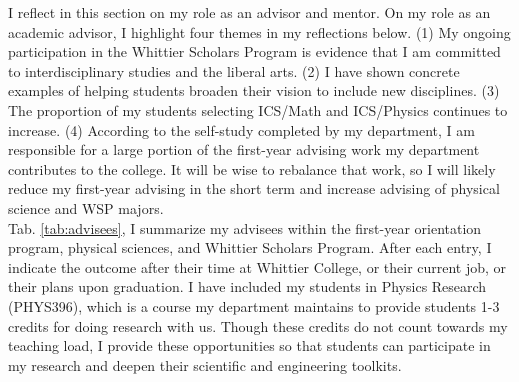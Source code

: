 \documentclass[../../main.tex]{subfiles}
\begin{document}
\label{sec:advising_mentoring}

I reflect in this section on my role as an advisor and mentor.  On my role as an academic advisor, I highlight four themes in my reflections below.  (1) My ongoing participation in the Whittier Scholars Program is evidence that I am committed to interdisciplinary studies and the liberal arts.  (2) I have shown concrete examples of helping students broaden their vision to include new disciplines.  (3) The proportion of my students selecting ICS/Math and ICS/Physics continues to increase.  (4) According to the self-study completed by my department, I am responsible for a large portion of the first-year advising work my department contributes to the college.  It will be wise to rebalance that work, so I will likely reduce my first-year advising in the short term and increase advising of physical science and WSP majors.
\\
\vspace{0.25cm}
Tab. \ref{tab:advisees}, I summarize my advisees within the first-year orientation program, physical sciences, and Whittier Scholars Program.  After each entry, I indicate the outcome after their time at Whittier College, or their current job, or their plans upon graduation.  I have included my students in Physics Research (PHYS396), which is a course my department maintains to provide students 1-3 credits for doing research with us.  Though these credits do not count towards my teaching load, I provide these opportunities so that students can participate in my research and deepen their scientific and engineering toolkits.
\end{document}

